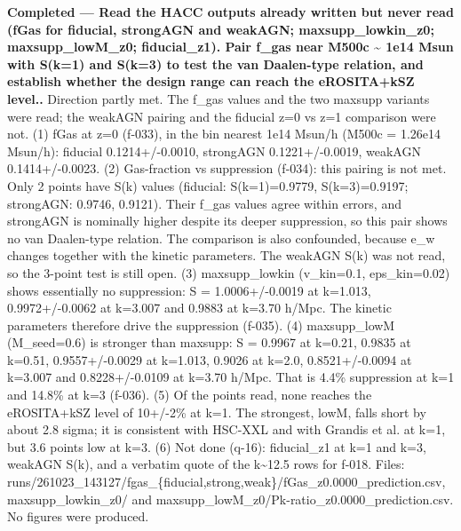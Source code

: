 \documentclass[11pt,a4paper]{article}
\begin{document}
\textbf{Completed --- Read the HACC outputs already written but never read (fGas for fiducial, strongAGN and weakAGN; maxsupp\_lowkin\_z0; maxsupp\_lowM\_z0; fiducial\_z1). Pair f\_gas near M500c \textasciitilde{} 1e14 Msun with S(k=1) and S(k=3) to test the van Daalen-type relation, and establish whether the design range can reach the eROSITA+kSZ level..} Direction partly met. The f\_gas values and the two maxsupp variants were read; the weakAGN pairing and the fiducial z=0 vs z=1 comparison were not. (1) fGas at z=0 (f-033), in the bin nearest 1e14 Msun/h (M500c = 1.26e14 Msun/h): fiducial 0.1214+/-0.0010, strongAGN 0.1221+/-0.0019, weakAGN 0.1414+/-0.0023. (2) Gas-fraction vs suppression (f-034): this pairing is not met. Only 2 points have S(k) values (fiducial: S(k=1)=0.9779, S(k=3)=0.9197; strongAGN: 0.9746, 0.9121). Their f\_gas values agree within errors, and strongAGN is nominally higher despite its deeper suppression, so this pair shows no van Daalen-type relation. The comparison is also confounded, because e\_w changes together with the kinetic parameters. The weakAGN S(k) was not read, so the 3-point test is still open. (3) maxsupp\_lowkin (v\_kin=0.1, eps\_kin=0.02) shows essentially no suppression: S = 1.0006+/-0.0019 at k=1.013, 0.9972+/-0.0062 at k=3.007 and 0.9883 at k=3.70 h/Mpc. The kinetic parameters therefore drive the suppression (f-035). (4) maxsupp\_lowM (M\_seed=0.6) is stronger than maxsupp: S = 0.9967 at k=0.21, 0.9835 at k=0.51, 0.9557+/-0.0029 at k=1.013, 0.9026 at k=2.0, 0.8521+/-0.0094 at k=3.007 and 0.8228+/-0.0109 at k=3.70 h/Mpc. That is 4.4\% suppression at k=1 and 14.8\% at k=3 (f-036). (5) Of the points read, none reaches the eROSITA+kSZ level of 10+/-2\% at k=1. The strongest, lowM, falls short by about 2.8 sigma; it is consistent with HSC-XXL and with Grandis et al. at k=1, but 3.6 points low at k=3. (6) Not done (q-16): fiducial\_z1 at k=1 and k=3, weakAGN S(k), and a verbatim quote of the k\textasciitilde{}12.5 rows for f-018. Files: runs/261023\_143127/fgas\_\{fiducial,strong,weak\}/fGas\_z0.0000\_prediction.csv, maxsupp\_lowkin\_z0/ and maxsupp\_lowM\_z0/Pk-ratio\_z0.0000\_prediction.csv. No figures were produced.
\end{document}
